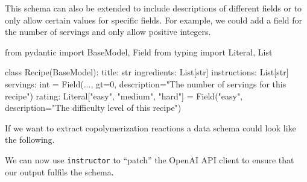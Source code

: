\documentclass[
  letterpaper,
  DIV=11,
  numbers=noendperiod]{scrreprt}
\newenvironment{Shaded}{\begin{snugshade}}{\end{snugshade}}
\newcommand{\BuiltInTok}[1]{\textcolor[rgb]{0.00,0.23,0.31}{#1}}
\newcommand{\DecValTok}[1]{\textcolor[rgb]{0.68,0.00,0.00}{#1}}
\newcommand{\ImportTok}[1]{\textcolor[rgb]{0.00,0.46,0.62}{#1}}
\newcommand{\KeywordTok}[1]{\textcolor[rgb]{0.00,0.23,0.31}{#1}}
\newcommand{\NormalTok}[1]{\textcolor[rgb]{0.00,0.23,0.31}{#1}}
\newcommand{\OperatorTok}[1]{\textcolor[rgb]{0.37,0.37,0.37}{#1}}
\newcommand{\StringTok}[1]{\textcolor[rgb]{0.13,0.47,0.30}{#1}}
\begin{document}
This schema can also be extended to include descriptions of different
fields or to only allow certain values for specific fields. For example,
we could add a field for the number of servings and only allow positive
integers.

\begin{Shaded}
\begin{Highlighting}[]
\ImportTok{from}\NormalTok{ pydantic }\ImportTok{import}\NormalTok{ BaseModel, Field}
\ImportTok{from}\NormalTok{ typing }\ImportTok{import}\NormalTok{ Literal, List}

\KeywordTok{class}\NormalTok{ Recipe(BaseModel):}
\NormalTok{    title: }\BuiltInTok{str}
\NormalTok{    ingredients: List[}\BuiltInTok{str}\NormalTok{]}
\NormalTok{    instructions: List[}\BuiltInTok{str}\NormalTok{]}
\NormalTok{    servings: }\BuiltInTok{int} \OperatorTok{=}\NormalTok{ Field(..., gt}\OperatorTok{=}\DecValTok{0}\NormalTok{, description}\OperatorTok{=}\StringTok{"The number of servings for this recipe"}\NormalTok{)}
\NormalTok{    rating: Literal[}\StringTok{"easy"}\NormalTok{, }\StringTok{"medium"}\NormalTok{, }\StringTok{"hard"}\NormalTok{] }\OperatorTok{=}\NormalTok{ Field(}\StringTok{"easy"}\NormalTok{, description}\OperatorTok{=}\StringTok{"The difficulty level of this recipe"}\NormalTok{)}
\end{Highlighting}
\end{Shaded}

If we want to extract copolymerization reactions a data schema could
look like the following.

We can now use \texttt{instructor} to ``patch'' the OpenAI API client to
ensure that our output fulfils the schema.
\end{document}
